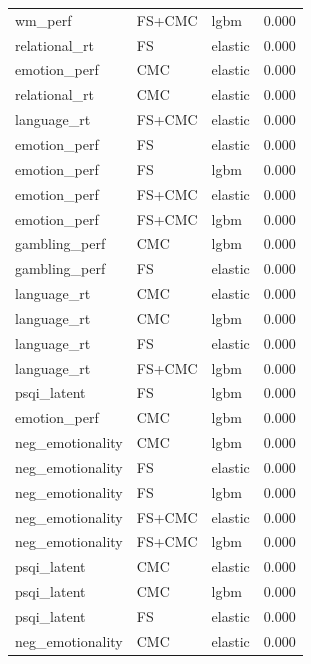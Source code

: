 \documentclass{article}
\begin{document}
\begin{longtable}{lllr}
	wm\_perf & FS+CMC & lgbm & 0.000 \\
	relational\_rt & FS & elastic & 0.000 \\
	emotion\_perf & CMC & elastic & 0.000 \\
	relational\_rt & CMC & elastic & 0.000 \\
	language\_rt & FS+CMC & elastic & 0.000 \\
	emotion\_perf & FS & elastic & 0.000 \\
	emotion\_perf & FS & lgbm & 0.000 \\
	emotion\_perf & FS+CMC & elastic & 0.000 \\
	emotion\_perf & FS+CMC & lgbm & 0.000 \\
	gambling\_perf & CMC & lgbm & 0.000 \\
	gambling\_perf & FS & elastic & 0.000 \\
	language\_rt & CMC & elastic & 0.000 \\
	language\_rt & CMC & lgbm & 0.000 \\
	language\_rt & FS & elastic & 0.000 \\
	language\_rt & FS+CMC & lgbm & 0.000 \\
	psqi\_latent & FS & lgbm & 0.000 \\
	emotion\_perf & CMC & lgbm & 0.000 \\
	neg\_emotionality & CMC & lgbm & 0.000 \\
	neg\_emotionality & FS & elastic & 0.000 \\
	neg\_emotionality & FS & lgbm & 0.000 \\
	neg\_emotionality & FS+CMC & elastic & 0.000 \\
	neg\_emotionality & FS+CMC & lgbm & 0.000 \\
	psqi\_latent & CMC & elastic & 0.000 \\
	psqi\_latent & CMC & lgbm & 0.000 \\
	psqi\_latent & FS & elastic & 0.000 \\
	neg\_emotionality & CMC & elastic & 0.000 \\
\end{longtable}




\end{document}
